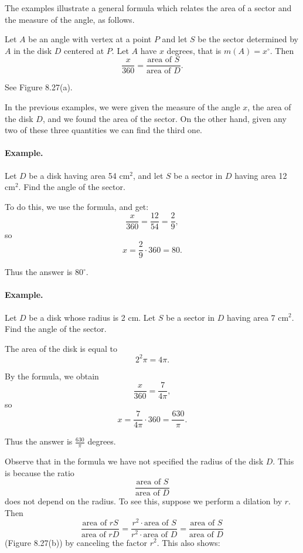 \documentclass[12pt]{book} %
\begin{document}
The examples illustrate a general formula which relates the area of a sector and the measure of the angle, as follows.

Let $A$ be an angle with vertex at a point $P$ and let $S$ be the sector determined by $A$ in the disk $D$ centered at $P$. Let $A$ have $x$ degrees, that is $m(A)=x^\circ$. Then
\[
\frac{x}{360}=\frac{\text{area of }S}{\text{area of }D}.
\]

See Figure 8.27(a).


In the previous examples, we were given the measure of the angle $x$, the area of the disk $D$, and we found the area of the sector. On the other hand, given any two of these three quantities we can find the third one.

\paragraph{Example.}
Let $D$ be a disk having area 54 cm$^2$, and let $S$ be a sector in $D$ having area 12 cm$^2$. Find the angle of the sector.

To do this, we use the formula, and get:
\[
\frac{x}{360}=\frac{12}{54}=\frac{2}{9},
\]
so
\[
x=\frac{2}{9}\cdot 360=80.
\]

Thus the answer is $80^\circ$.

\paragraph{Example.}
Let $D$ be a disk whose radius is 2 cm. Let $S$ be a sector in $D$ having area 7 cm$^2$. Find the angle of the sector.

The area of the disk is equal to
\[
2^2\pi=4\pi.
\]

By the formula, we obtain
\[
\frac{x}{360}=\frac{7}{4\pi},
\]
so
\[
x=\frac{7}{4\pi}\cdot 360=\frac{630}{\pi}.
\]

Thus the answer is $\frac{630}{\pi}$ degrees.

Observe that in the formula we have not specified the radius of the disk $D$. This is because the ratio
\[
\frac{\text{area of }S}{\text{area of }D}
\]
does not depend on the radius. To see this, suppose we perform a dilation by $r$. Then
\[
\frac{\text{area of }rS}{\text{area of }rD}
=
\frac{r^2\cdot \text{area of }S}{r^2\cdot \text{area of }D}
=
\frac{\text{area of }S}{\text{area of }D}
\]
(Figure 8.27(b))
by canceling the factor $r^2$. This also shows:

\end{document}

